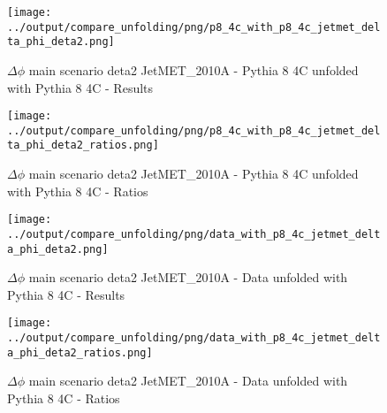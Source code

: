 \documentclass[11pt]{book}
\begin{document}
\begin{figure}[ht]
\centering
\texttt{[image: ../output/compare\_unfolding/png/p8\_4c\_with\_p8\_4c\_jetmet\_delta\_phi\_deta2.png]}
\caption{$\Delta\phi$ main scenario deta2 JetMET\_2010A - Pythia 8 4C unfolded with Pythia 8 4C - Results}
\label{p8_p8_jetmet_delta_phi_deta2_a}
\end{figure}

\begin{figure}[ht]
\centering
\texttt{[image: ../output/compare\_unfolding/png/p8\_4c\_with\_p8\_4c\_jetmet\_delta\_phi\_deta2\_ratios.png]}
\caption{$\Delta\phi$ main scenario deta2 JetMET\_2010A - Pythia 8 4C unfolded with Pythia 8 4C - Ratios}
\label{p8_p8_jetmet_delta_phi_deta2_b}
\end{figure}

\begin{comment}

\begin{figure}[ht]
\centering
\texttt{[image: ../output/compare\_unfolding/png/p6\_z2\_with\_p8\_4c\_jetmet\_delta\_phi\_deta2.png]}
\caption{$\Delta\phi$ main scenario deta2 JetMET\_2010A - Pythia 6 Z2* unfolded with Pythia 8 4C - Results}
\label{p6_p8_jetmet_delta_phi_deta2_a}
\end{figure}

\begin{figure}[ht]
\centering
\texttt{[image: ../output/compare\_unfolding/png/p6\_z2\_with\_p8\_4c\_jetmet\_delta\_phi\_deta2\_ratios.png]}
\caption{$\Delta\phi$ main scenario deta2 JetMET\_2010A - Pythia 6 Z2* unfolded with Pythia 8 4C - Ratios}
\label{p6_p8_jetmet_delta_phi_deta2_b}
\end{figure}

\end{comment}

\begin{figure}[ht]
\centering
\texttt{[image: ../output/compare\_unfolding/png/data\_with\_p8\_4c\_jetmet\_delta\_phi\_deta2.png]}
\caption{$\Delta\phi$ main scenario deta2 JetMET\_2010A - Data unfolded with Pythia 8 4C - Results}
\label{data_p8_jetmet_delta_phi_deta2_a}
\end{figure}

\begin{figure}[ht]
\centering
\texttt{[image: ../output/compare\_unfolding/png/data\_with\_p8\_4c\_jetmet\_delta\_phi\_deta2\_ratios.png]}
\caption{$\Delta\phi$ main scenario deta2 JetMET\_2010A - Data unfolded with Pythia 8 4C - Ratios}
\label{data_p8_jetmet_delta_phi_deta2_b}
\end{figure}
\end{document}
